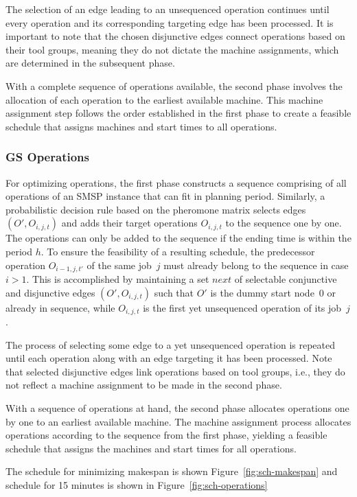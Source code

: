 The selection of an edge leading to an unsequenced operation continues until every operation and its corresponding targeting edge has been processed. It is important to note that the chosen disjunctive edges connect operations based on their tool groups, meaning they do not dictate the machine assignments, which are determined in the subsequent phase.

With a complete sequence of operations available, the second phase involves the allocation of each operation to the earliest available machine. This machine assignment step follows the order established in the first phase to create a feasible schedule that assigns machines and start times to all operations.


\subsubsection{GS Operations}
For optimizing operations, the first phase constructs a sequence comprising of all operations
of an SMSP instance that can fit in planning period.
Similarly, a probabilistic decision rule based on the pheromone
matrix selects edges $(O',O_{i,j,t})$
and adds their target operations $O_{i,j,t}$
to the sequence one by one. The operations can only be added to the sequence if the ending time is within the period $h$.
To ensure the feasibility of a resulting schedule,
the predecessor operation $O_{i-1,j,t'}$ of the same job~$j$
must already belong to the sequence in case $i>1$.
This is accomplished by maintaining a set $\mathit{next}$
of selectable conjunctive and disjunctive edges $(O',O_{i,j,t})$
such that $O'$ is the dummy start node~$0$ or already in sequence,
while $O_{i,j,t}$ is the first yet unsequenced operation of its job~$j$.

The process of selecting some edge to a yet unsequenced operation
is repeated until each operation along with an edge targeting it
has been processed.
Note that selected disjunctive edges link operations based on tool groups,
i.e., they do not reflect a machine assignment to be made in the second phase.

With a sequence of operations at hand,
the second phase allocates operations one by one to an earliest
available machine.
The machine assignment process allocates operations
according to the sequence from the first phase, yielding a
feasible schedule that assigns the machines and start times for all operations.

The schedule for minimizing makespan is shown Figure~\ref{fig:sch-makespan} and schedule for 15 minutes is shown in Figure~\ref{fig:sch-operations}

